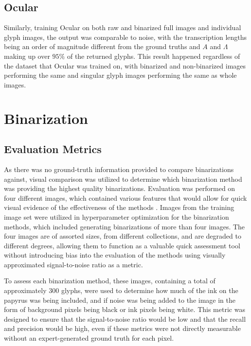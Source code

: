 \subsection{Ocular}

Similarly, training Ocular on both raw and binarized full images and individual glyph images, the output was comparable to noise, with the transcription lengths being an order of magnitude different from the ground truths and $A$ and $\Lambda$ making up over $95\%$ of the returned glyphs. This result happened regardless of the dataset that Ocular was trained on, with binarized and non-binarized images performing the same and singular glyph images performing the same as whole images.

\section{Binarization}

\subsection{Evaluation Metrics}
As there was no ground-truth information provided to compare binarizations against, visual comparison was utilized to determine which binarization method was providing the highest quality binarizations. Evaluation was performed on four different images, which contained various features that would allow for quick visual evidence of the effectiveness of the methods . Images from the training image set were utilized in hyperparameter optimization for the binarization methods, which included generating binarizations of more than four images. The four images are of assorted sizes, from different collections, and are degraded to different degrees, allowing them to function as a valuable quick assessment tool without introducing bias into the evaluation of the methods using visually approximated signal-to-noise ratio as a metric.

To assess each binarization method, these images, containing a total of approximately $300$ glyphs, were used to determine how much of the ink on the papyrus was being included, and if noise was being added to the image in the form of background pixels being black or ink pixels being white. This metric was designed to ensure that the signal-to-noise ratio would be low and that the recall and precision would be high, even if these metrics were not directly measurable without an expert-generated ground truth for each pixel.

